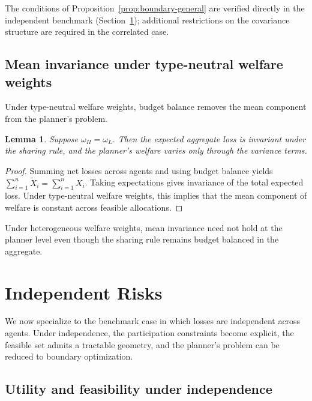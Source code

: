 \documentclass[a4paper,12pt]{article}
\newtheorem{lemma}[theorem]{Lemma}
\theoremstyle{definition}
\theoremstyle{remark}
\newcommand{\1}{\mathbf{1}}
\begin{document}
The conditions of Proposition~\ref{prop:boundary-general} are verified directly in the independent benchmark (Section~\ref{sec:ind}); additional restrictions on the covariance structure are required in the correlated case.

\subsection{Mean invariance under type-neutral welfare weights}

Under type-neutral welfare weights, budget balance removes the mean component from the planner's problem.

\begin{lemma}\label{lem:mean-invariance}
Suppose \(\omega_H=\omega_L\). Then the expected aggregate loss is invariant under the sharing rule, and the planner's welfare varies only through the variance terms.
\end{lemma}

\begin{proof}
Summing net losses across agents and using budget balance yields
\(\sum_{i=1}^n \tilde X_i = \sum_{i=1}^n X_i\).
Taking expectations gives invariance of the total expected loss. Under type-neutral welfare weights, this implies that the mean component of welfare is constant across feasible allocations.
\end{proof}

Under heterogeneous welfare weights, mean invariance need not hold at the planner level even though the sharing rule remains budget balanced in the aggregate.



\section{Independent Risks}\label{sec:ind}

We now specialize to the benchmark case in which losses are independent across agents. Under independence, the participation constraints become explicit, the feasible set admits a tractable geometry, and the planner's problem can be reduced to boundary optimization.

\subsection{Utility and feasibility under independence}
\end{document}

